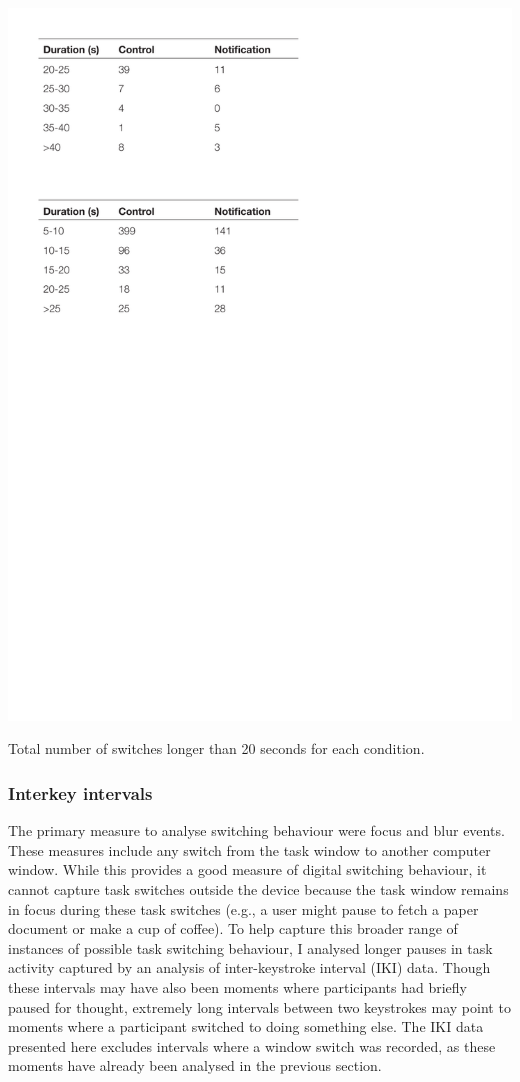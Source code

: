 \begin{table}
\centering
\centerline{\includegraphics[scale=0.8]{images/ch56/ch56_LongSwitches.pdf}}
\caption{Total number of switches longer than 20 seconds for each condition.}
\label{tbl:ch56-tblswitches}
\end{table}

\subsubsection{Interkey intervals}
The primary measure to analyse switching behaviour were focus and blur events. These measures include any switch from the task window to another computer window. While this provides a good measure of digital switching behaviour, it cannot capture task switches outside the device because the task window remains in focus during these task switches (e.g., a user might pause to fetch a paper document or make a cup of coffee). To help capture this broader range of instances of possible task switching behaviour, I analysed longer pauses in task activity captured by an analysis of inter-keystroke interval (IKI) data. Though these intervals may have also been moments where participants had briefly paused for thought, extremely long intervals between two keystrokes may point to moments where a participant switched to doing something else. The IKI data presented here excludes intervals where a window switch was recorded, as these moments have already been analysed in the previous section.

